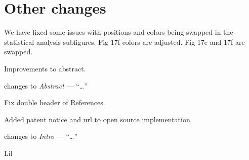 \documentclass[5p,twocolumn,10pt,times]{elsarticle}
\theoremstyle{definition}
\newcommand{\stkout}[1]{\ifmmode\text{\sout{\ensuremath{#1}}}\else\sout{#1}\fi}
\newcommand{\revise}[2]{\noindent{\color{red}{\stkout{#1}}}\noindent{\color{blue}{#2}}}
\newcommand{\commits}[1]{{\bf\begin{alltt} {#1}\end{alltt}}}
\renewcommand{\commits}[1]{}
\newcommand\paper[2]{\par changes to \emph{#1} --- ``#2'' }
\renewcommand\paper[2]{\par changes to \emph{#1} --- ``\dots'' }
\numberwithin{question}{section}
\begin{document}
\section{Other changes}
We have fixed some issues with positions and colors being swapped in the statistical analysis subfigures.
Fig 17f colors are adjusted.
Fig 17e and 17f are swapped.
\commits{43cadb352a6a276bbaaab53f9b5b217bec4b3a2e}

Improvements to abstract.
\commits{c5ecf8f8c5c15266059278a6b4c26774446e7854}
\paper{Abstract}{
Toolpath with uniform inward offsets from the outline polygons produce over- and underfill regions in the center of the shape, which are especially problematic for thin parts such as casings and microstructures.
\revise{Toolpath with uniform }{Toolpaths consisting of \emph{uniform}} inward offsets from the outline polygons produce over- and underfill regions in the center of the shape, which are especially \revise{problematic for }{detrimental to the mechanical performance of} thin parts such as casings and microstructures.
 Existing approaches for generating toolpaths with adaptive width result in a large variation in widths, which for some hardware systems is difficult to realize accurately, if not beyond their capabilities.
 In this paper we present a framework which supports multiple schemes to generate toolpaths with adaptive width, by using a function to decide the number of beads and their widths which are applied from the center outward.
Furthermore, we propose a novel scheme for FDM printing which \revise{avoids}{reduces} extreme bead width deviation\revise{ from the nozzle size}{}, \revise{and limits}{while limiting} the number of altered toolpaths.
We validate the effectiveness of our framework and this novel scheme on a data set of 300 \revise{slices}{layer outlines}.
}



Fix double header of References.
\commits{7597b176f6a88ae98c8c7a4c791475af356b3da6}

Added patent notice and url to open source implementation.
\commits{ff3c09037f05eba5028cb51bf8cd6c0bb77a0b0a}
\paper{Intro}{
\revise{}{The presented framework is patented by Ultimaker and open source available at \url{github.com/Ultimaker/libArachne}.}
}

Lil
\commits{5f5c4c640d94010816e6d6d5934a2dc016b4d172}
\end{document}
